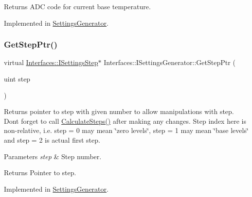 \begin{DoxyReturn}{Returns}
A\+DC code for current base temperature. 
\end{DoxyReturn}


Implemented in \hyperlink{class_settings_generator_a5f3f78597f001c127b89f6447a46df09}{Settings\+Generator}.

\mbox{\label{class_interfaces_1_1_i_settings_generator_af1b65a18c3ade3235715ae2e9cdbcfe0}} 
\subsubsection{\texorpdfstring{Get\+Step\+Ptr()}{GetStepPtr()}}
{\footnotesize\ttfamily virtual \hyperlink{class_interfaces_1_1_i_settings_step}{Interfaces\+::\+I\+Settings\+Step}$\ast$ Interfaces\+::\+I\+Settings\+Generator\+::\+Get\+Step\+Ptr (\begin{DoxyParamCaption}\item[{uint}]{step }\end{DoxyParamCaption})\hspace{0.3cm}{\ttfamily [pure virtual]}}



Returns pointer to step with given number to allow manipulations with step. Don\textquotesingle{}t forget to call \hyperlink{class_interfaces_1_1_i_settings_generator_a7788522bb5d25bfd8b8af430512ec5f5}{Calculate\+Steps()} after making any changes. Step index here is non-\/relative, i.\+e. step = 0 may mean \char`\"{}zero levels\char`\"{}, step = 1 may mean \char`\"{}base levels\char`\"{} and step = 2 is actual first step. 


\begin{DoxyParams}{Parameters}
{\em step} & Step number. \\
\hline
\end{DoxyParams}
\begin{DoxyReturn}{Returns}
Pointer to step. 
\end{DoxyReturn}


Implemented in \hyperlink{class_settings_generator_a37f4175a0ed24853b2f187f15505086b}{Settings\+Generator}.

\mbox{\label{class_interfaces_1_1_i_settings_generator_a8de5944be5295009b7407772bc9b1b3b}} 
